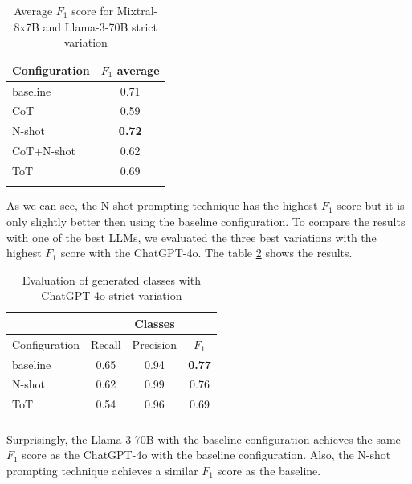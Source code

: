 \begin{table}[!h]
    \scriptsize
    \centering
    \setlength{\tabcolsep}{0.5em}
    \begin{tabular}{lc}
    \toprule
        Configuration & $F_1$ average \\
    \toprule
    
    \addlinespace
         baseline   & 0.71 \\
         CoT        & 0.59 \\
         N-shot     & \textbf{0.72} \\
         CoT+N-shot & 0.62 \\
         ToT        & 0.69 \\
    \addlinespace
    \bottomrule
    \addlinespace
    \end{tabular}
    \caption{Average $F_1$ score for Mixtral-8x7B and Llama-3-70B strict variation}
    \label{tab:average-classes}
\end{table}

As we can see, the N-shot prompting technique has the highest $F_1$ score but it is only slightly better then using the baseline configuration. To compare the results with one of the best LLMs, we evaluated the three best variations with the highest $F_1$ score with the ChatGPT-4o. The table \ref{tab:chatgpt-classes} shows the results.


\begin{table}[!h]
    \scriptsize
    \centering
    \setlength{\tabcolsep}{0.5em}
    \begin{tabular}{lccc}
    \toprule
    & & Classes & \\
    \toprule
       Configuration & Recall & Precision & $F_1$ \\
    \toprule
    
    \addlinespace
         baseline    & 0.65 & 0.94 & \textbf{0.77} \\
         N-shot      & 0.62 & 0.99 & 0.76 \\
         ToT         & 0.54 & 0.96 & 0.69 \\
    \addlinespace
    \bottomrule
    \addlinespace
    \end{tabular}
    \caption{Evaluation of generated classes with ChatGPT-4o strict variation}
    \label{tab:chatgpt-classes}
\end{table}

Surprisingly, the Llama-3-70B with the baseline configuration achieves the same $F_1$ score as the ChatGPT-4o with the baseline configuration. Also, the N-shot prompting technique achieves a similar $F_1$ score as the baseline.


